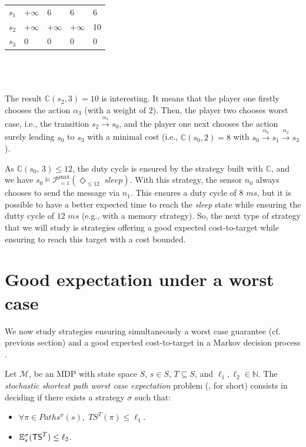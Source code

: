 \begin{example}
\begin{minipage}{0.5\linewidth}
\begin{tabular}{l|llll}
$s_1$  & $+\infty$ & 6         & 6         & 6     \\
$s_2$  & $+\infty$ & $+\infty$ & $+\infty$ & 10    \\
$s_3$  & 0         & 0         & 0         & 0
\end{tabular}
\captionsetup{justification=centering}
\end{minipage}
\\$ $\\$ $\\
The result $\mathbb{C}(s_2,3)=10$ is interesting. It means that the player one firstly chooses the action $\alpha_3$ (with a weight of $2$).
Then, the player two chooses worst case, i.e., the transition $s_2 \xrightarrow{\alpha_3}s_0$, and the player one next chooses the action surely leading $s_0$ to $s_3$ with a minimal cost (i.e., $\mathbb{C}(s_0, 2)=8$ with $s_0\xrightarrow{\alpha_0}s_1\xrightarrow{\alpha_2}s_3$).
\par As $\mathbb{C}(s_0,\, 3) \leq 12$, the duty cycle is ensured by the strategy built with $\mathbb{C}$, and we have $s_0 \models \mathcal{P}^{\max}_{=1}(\Diamond_{\leq 12}\; \textit{sleep})$.
With this strategy, the sensor $n_0$ always chooses to send the message via $n_1$.
This ensures a duty cycle of $8$ $ms$, but it is possible to have a better expected time to reach the \textit{sleep} state while ensuring the dutty cycle of $12$ $ms$ (e.g., with a memory strategy).
So, the next type of strategy that we will study is strategies offering a good expected cost-to-target while ensuring to reach this target with a cost bounded.
\end{example}

\section{Good expectation under a worst case}
We now study strategies ensuring simultaneously a worst case guarantee (cf. previous section) and a good expected cost-to-target in a Markov decision process \cite{DBLP:journals/corr/RandourRS14a,DBLP:journals/corr/BruyereFRR13}.
\begin{definition}
    Let $\mathcal{M}$, be an MDP with state space $S$, $s \in S$, $T \subseteq S$, and $\ell_1, \ell_2 \in \mathbb{N}$.
    The \textit{stochastic shortest path worst case expectation} problem (\SSPWE{}, for short) consists in deciding if there exists a strategy $\sigma$ such that:
    \begin{itemize}
      \item $\forall \pi \in Paths^\sigma(s), \; TS^T(\pi) \leq \ell_1$.
      \item $\mathbb{E}_s^\sigma(\text{\sffamily TS}^T) \leq \ell_2$.
    \end{itemize}
\end{definition}

